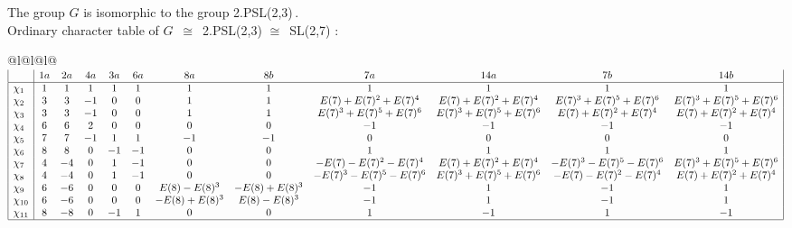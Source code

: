 \documentclass[varwidth=\maxdimen,border=10]{standalone}
\begin{document}
The group $G$ is isomorphic to the group 2.PSL(2,3)\,. \\
Ordinary character table of $G$\ $\cong$\  2.PSL(2,3) $\cong$\ SL(2,7) :\\
\begin{center}
\begin{tabular}{@{}l@{}l@{}l@{}}
\hline
\(\begin{array}{|l|ccccccccccc|}
  & 1a & 2a & 4a & 3a & 6a & 8a & 8b & 7a & 14a & 7b & 14b\\ \hline
\chi_{1} & 1 & 1 & 1 & 1 & 1 & 1 & 1 & 1 & 1 & 1 & 1\\
\chi_{2} & 3 & 3 & -1 & 0 & 0 & 1 & 1 & E(7)+E(7)^{2}+E(7)^{4} & E(7)+E(7)^{2}+E(7)^{4} & E(7)^{3}+E(7)^{5}+E(7)^{6} & E(7)^{3}+E(7)^{5}+E(7)^{6}\\
\chi_{3} & 3 & 3 & -1 & 0 & 0 & 1 & 1 & E(7)^{3}+E(7)^{5}+E(7)^{6} & E(7)^{3}+E(7)^{5}+E(7)^{6} & E(7)+E(7)^{2}+E(7)^{4} & E(7)+E(7)^{2}+E(7)^{4}\\
\chi_{4} & 6 & 6 & 2 & 0 & 0 & 0 & 0 & -1 & -1 & -1 & -1\\
\chi_{5} & 7 & 7 & -1 & 1 & 1 & -1 & -1 & 0 & 0 & 0 & 0\\
\chi_{6} & 8 & 8 & 0 & -1 & -1 & 0 & 0 & 1 & 1 & 1 & 1\\
\chi_{7} & 4 & -4 & 0 & 1 & -1 & 0 & 0 & -E(7)-E(7)^{2}-E(7)^{4} & E(7)+E(7)^{2}+E(7)^{4} & -E(7)^{3}-E(7)^{5}-E(7)^{6} & E(7)^{3}+E(7)^{5}+E(7)^{6}\\
\chi_{8} & 4 & -4 & 0 & 1 & -1 & 0 & 0 & -E(7)^{3}-E(7)^{5}-E(7)^{6} & E(7)^{3}+E(7)^{5}+E(7)^{6} & -E(7)-E(7)^{2}-E(7)^{4} & E(7)+E(7)^{2}+E(7)^{4}\\
\chi_{9} & 6 & -6 & 0 & 0 & 0 & E(8)-E(8)^{3} & -E(8)+E(8)^{3} & -1 & 1 & -1 & 1\\
\chi_{10} & 6 & -6 & 0 & 0 & 0 & -E(8)+E(8)^{3} & E(8)-E(8)^{3} & -1 & 1 & -1 & 1\\
\chi_{11} & 8 & -8 & 0 & -1 & 1 & 0 & 0 & 1 & -1 & 1 & -1\\
\hline
\end{array}\)\\
\end{tabular}
\end{center}
\end{document}
